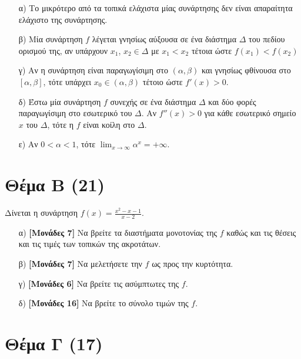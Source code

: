 \documentclass[14pt]{extarticle}
\begin{document}
\begin{enumerate}
      \begin{enumerate}
        \item [α)] Το μικρότερο από τα τοπικά ελάχιστα μίας συνάρτησης δεν είναι απαραίτητα ελάχιστο της συνάρτησης.
        \item [β)] Μία συνάρτηση $f$ λέγεται γνησίως αύξουσα σε ένα διάστημα $Δ$ του πεδίου ορισμού της, αν υπάρχουν $x_1$, $x_2\in Δ$ με $x_1<x_2$ τέτοια ώστε $f(x_1)<f(x_2)$
        \item [γ)] Αν η συνάρτηση είναι παραγωγίσιμη στο $(α,β)$ και γνησίως φθίνουσα στο $[α,β]$, τότε υπάρχει $x_0\in (α,β)$ τέτοιο ώστε $f'(x)>0$.
        \item [δ)] Έστω μία συνάρτηση $f$ συνεχής σε ένα διάστημα $Δ$ και δύο φορές παραγωγίσιμη στο εσωτερικό του $Δ$. Αν $f''(x)>0$ για κάθε εσωτερικό σημείο $x$ του $Δ$, τότε η $f$ είναι κοίλη στο $Δ$.
        \item [ε)] Αν $0<α<1$, τότε $\lim_{x\to \infty}α^x=+\infty$.
      \end{enumerate}
  \end{enumerate}

\section*{Θέμα Β (21)}
  \noindent
  Δίνεται η συνάρτηση $f(x)=\frac{x^2-x-1}{x-2}$.
  \begin{enumerate}
    \item [α)] \textbf{[Μονάδες 7]} Να βρείτε τα διαστήματα μονοτονίας της $f$ καθώς και τις θέσεις και τις τιμές των τοπικών της ακροτάτων.
    \item [β)] \textbf{[Μονάδες 7]} Να μελετήσετε την $f$ ως προς την κυρτότητα.
    \item [γ)] \textbf{[Μονάδες 6]} Να βρείτε τις ασύμπτωτες της $f$.
    \item [δ)] \textbf{[Μονάδες 16]} Να βρείτε το σύνολο τιμών της $f$.
  \end{enumerate}

\section*{Θέμα Γ (17)}
  \noindent
\end{document}

